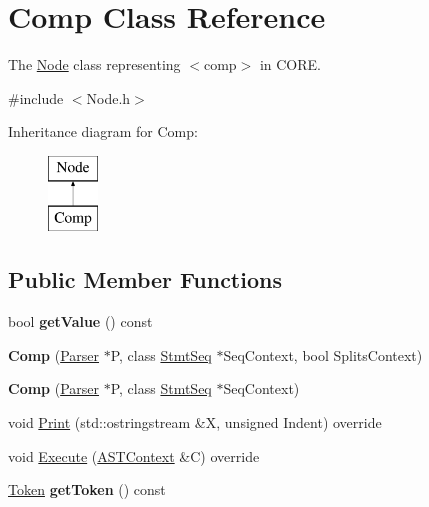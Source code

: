 \hypertarget{class_comp}{}\section{Comp Class Reference}
\label{class_comp}


The \mbox{\hyperlink{class_node}{Node}} class representing {\ttfamily $<$comp$>$} in C\+O\+RE.  




{\ttfamily \#include $<$Node.\+h$>$}

Inheritance diagram for Comp\+:\begin{figure}[H]
\begin{center}
\leavevmode
\includegraphics[height=2.000000cm]{class_comp}
\end{center}
\end{figure}
\subsection*{Public Member Functions}
\begin{DoxyCompactItemize}
\item 
\mbox{\label{class_comp_a30263f2c50135068e3d5a32775a6bfd0}} 
bool {\bfseries get\+Value} () const
\item 
\mbox{\label{class_comp_a3726f4db1126aca11dd1ab8162a5851b}} 
{\bfseries Comp} (\mbox{\hyperlink{class_parser}{Parser}} $\ast$P, class \mbox{\hyperlink{class_stmt_seq}{Stmt\+Seq}} $\ast$Seq\+Context, bool Splits\+Context)
\item 
\mbox{\label{class_comp_a8770feb5e001e7361328aa01f71775d8}} 
{\bfseries Comp} (\mbox{\hyperlink{class_parser}{Parser}} $\ast$P, class \mbox{\hyperlink{class_stmt_seq}{Stmt\+Seq}} $\ast$Seq\+Context)
\item 
void \mbox{\hyperlink{class_comp_abc0e0fdd3a8963d5d60017c38765d0b4}{Print}} (std\+::ostringstream \&X, unsigned Indent) override
\item 
void \mbox{\hyperlink{class_comp_a3f6905eb5b4ed784a458070315fee5a1}{Execute}} (\mbox{\hyperlink{class_a_s_t_context}{A\+S\+T\+Context}} \&C) override
\item 
\mbox{\label{class_comp_af05663b1e946a2104febdb46f24608fe}} 
\mbox{\hyperlink{class_token}{Token}} {\bfseries get\+Token} () const
\end{DoxyCompactItemize}
